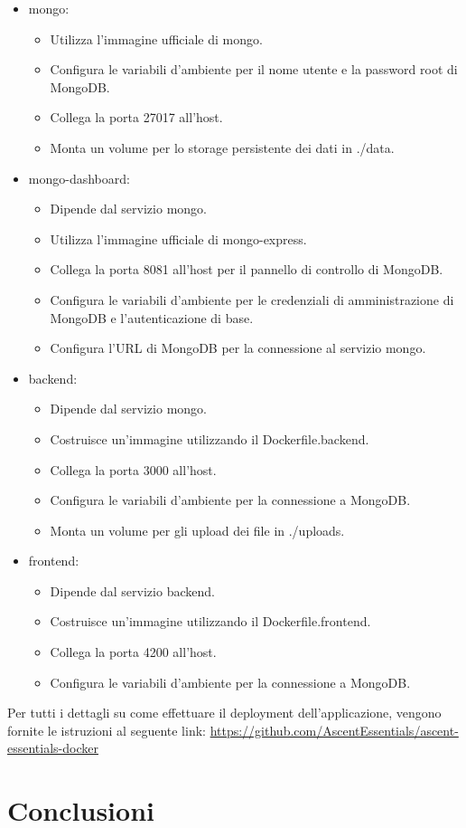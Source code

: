 \documentclass[12pt,a4paper,openright,twoside]{book}
\begin{document}
\begin{itemize}
    \item mongo:
    \begin{itemize}
        \item Utilizza l'immagine ufficiale di mongo.
        \item Configura le variabili d'ambiente per il nome utente e la password root di MongoDB.
        \item Collega la porta 27017 all'host.
        \item Monta un volume per lo storage persistente dei dati in ./data.
    \end{itemize}
    \item mongo-dashboard:
    \begin{itemize}
        \item Dipende dal servizio mongo.
        \item Utilizza l'immagine ufficiale di mongo-express.
        \item Collega la porta 8081 all'host per il pannello di controllo di MongoDB.
        \item Configura le variabili d'ambiente per le credenziali di amministrazione di MongoDB e l'autenticazione di base.
        \item Configura l'URL di MongoDB per la connessione al servizio mongo.
    \end{itemize}
    \item backend:
    \begin{itemize}
        \item Dipende dal servizio mongo.
        \item Costruisce un'immagine utilizzando il Dockerfile.backend.
        \item Collega la porta 3000 all'host.
        \item Configura le variabili d'ambiente per la connessione a MongoDB.
        \item Monta un volume per gli upload dei file in ./uploads.
    \end{itemize}
    \item frontend:
    \begin{itemize}
        \item Dipende dal servizio backend.
        \item Costruisce un'immagine utilizzando il Dockerfile.frontend.
        \item Collega la porta 4200 all'host.
        \item Configura le variabili d'ambiente per la connessione a MongoDB.
    \end{itemize}
\end{itemize}

Per tutti i dettagli su come effettuare il deployment dell'applicazione, vengono fornite le istruzioni al seguente link: \url{https://github.com/AscentEssentials/ascent-essentials-docker}

\chapter{Conclusioni}



\end{document}
